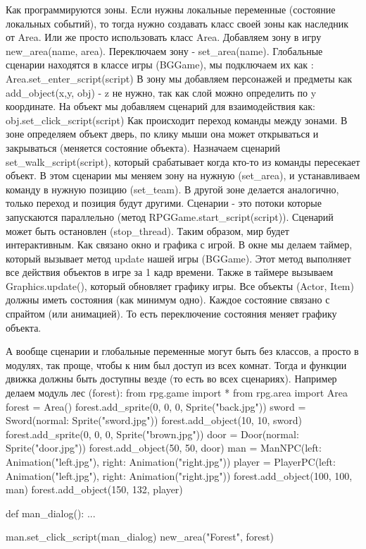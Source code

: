 Как программируются зоны. Если нужны локальные переменные (состояние локальных событий), то тогда нужно создавать класс своей зоны как наследник от Area. Или же просто использовать класс Area. Добавляем зону в игру new\_area(name, area). Переключаем зону - set\_area(name). Глобальные сценарии находятся в классе игры (BGGame), мы подключаем их как :
Area.set\_enter\_script(script)
В зону мы добавляем персонажей и предметы как add\_object(x,y, obj) - z не нужно, так как слой можно определить по y координате.
На объект мы добавляем сценарий для взаимодействия как: obj.set\_click\_script(script)
Как происходит переход команды между зонами.
В зоне определяем объект дверь, по клику мыши она может открываться и закрываться (меняется состояние объекта). Назначаем сценарий set\_walk\_script(script), который срабатывает когда кто-то из команды пересекает объект. В этом сценарии мы меняем зону на нужную (set\_area), и устанавливаем команду в нужную позицию (set\_team). В другой зоне делается аналогично, только переход и позиция будут другими.
Сценарии - это потоки которые запускаются параллельно (метод RPGGame.start\_script(script)). Сценарий может быть остановлен (stop\_thread).
Таким образом, мир будет интерактивным.
Как связано окно и графика с игрой. В окне мы делаем таймер, который вызывает метод update нашей игры (BGGame). Этот метод выполняет все действия объектов в игре за 1 кадр времени.
Также в таймере вызываем Graphics.update(), который обновляет графику игры.
Все объекты (Actor, Item) должны иметь состояния (как минимум одно). Каждое состояние связано с спрайтом (или анимацией). То есть переключение состояния меняет графику объекта.

А вообще сценарии и глобальные переменные могут быть без классов, а просто в модулях, так проще, чтобы к ним был доступ из всех комнат. Тогда и функции движка должны быть доступны везде (то есть во всех сценариях). Например делаем модуль лес (forest):
from rpg.game import *
from rpg.area import Area
forest = Area()
forest.add\_sprite(0, 0, 0, Sprite("back.jpg"))
sword = Sword(normal: Sprite("sword.jpg"))
forest.add\_object(10, 10, sword)
forest.add\_sprite(0, 0, 0, Sprite("brown.jpg"))
door = Door(normal: Sprite("door.jpg"))
forest.add\_object(50, 50, door)
man = ManNPC(left: Animation("left.jpg"), right: Animation("right.jpg"))
player = PlayerPC(left: Animation("left.jpg"), right: Animation("right.jpg"))
forest.add\_object(100, 100, man)
forest.add\_object(150, 132, player)

def man\_dialog():
...

man.set\_click\_script(man\_dialog)
new\_area("Forest", forest)

